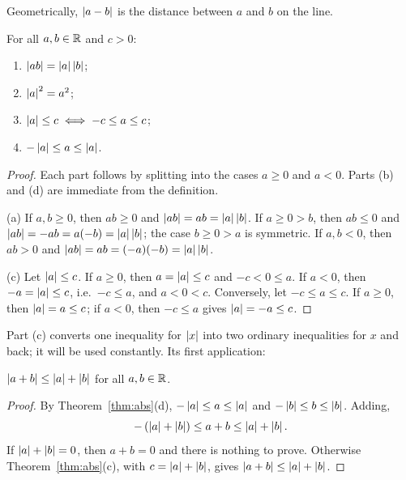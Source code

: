 Geometrically, $\left|a-b\right|$ is the distance between $a$ and $b$ on the line.

\begin{theorem}\label{thm:abs}
    For all $a, b \in \mathbb{R}$ and $c>0$:
    \begin{enumerate}[label=(\alph*)]
        \item $\left|ab\right| = \left|a\right|\left|b\right|$;
        \item $\left|a\right|^2 = a^2$;
        \item $\left|a\right| \leq c \iff -c \leq a \leq c$;
        \item $-\left|a\right| \leq a \leq \left|a\right|$.
    \end{enumerate}
\end{theorem}

\begin{proof}
    Each part follows by splitting into the cases $a\geq0$ and $a<0$.
    Parts (b) and (d) are immediate from the definition.

    (a) If $a,b\geq0$, then $ab\geq0$ and $\left|ab\right|=ab=\left|a\right|\left|b\right|$. If
    $a\geq0>b$, then $ab\leq0$ and $\left|ab\right|=-ab=a(-b)=\left|a\right|\left|b\right|$;
    the case $b\geq0>a$ is symmetric. If $a,b<0$, then $ab>0$ and
    $\left|ab\right|=ab=(-a)(-b)=\left|a\right|\left|b\right|$.

    (c) Let $\left|a\right|\leq c$. If $a\geq0$, then $a=\left|a\right|\leq c$ and
    $-c<0\leq a$. If $a<0$, then $-a=\left|a\right|\leq c$, i.e.\ $-c\leq a$, and
    $a<0<c$. Conversely, let $-c\leq a\leq c$. If $a\geq0$, then
    $\left|a\right|=a\leq c$; if $a<0$, then $-c\leq a$ gives $\left|a\right|=-a\leq c$.
\end{proof}

Part (c) converts one inequality for $\left|x\right|$ into two ordinary
inequalities for $x$ and back; it will be used constantly. Its first
application:

\begin{proposition}\label{prop:triangle}
    $\left|a + b \right| \leq \left|a\right| + \left|b\right|$ for all $a, b \in \mathbb{R}$.
\end{proposition}

\begin{proof}
    By Theorem~\ref{thm:abs}(d), $-\left|a\right| \leq a \leq \left|a\right|$ and
    $-\left|b\right| \leq b \leq \left|b\right|$. Adding,
    \begin{equation*}
        -\left(\left|a\right| + \left|b\right|\right) \leq a + b \leq \left|a\right| + \left|b\right|.
    \end{equation*}
    If $\left|a\right|+\left|b\right|=0$, then $a+b=0$ and there is nothing to prove.
    Otherwise Theorem~\ref{thm:abs}(c), with $c=\left|a\right|+\left|b\right|$, gives
    $\left|a+b\right|\leq\left|a\right|+\left|b\right|$.
\end{proof}

